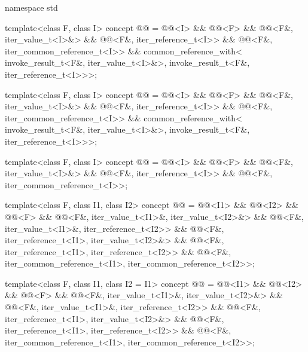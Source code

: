 \begin{codeblock}
namespace std {
  template<class F, class I>
    concept @@ =
      @@<I> &&
      @@<F> &&
      @@<F&, iter_value_t<I>&> &&
      @@<F&, iter_reference_t<I>> &&
      @@<F&, iter_common_reference_t<I>> &&
      common_reference_with<
        invoke_result_t<F&, iter_value_t<I>&>,
        invoke_result_t<F&, iter_reference_t<I>>>;

  template<class F, class I>
    concept @@ =
      @@<I> &&
      @@<F> &&
      @@<F&, iter_value_t<I>&> &&
      @@<F&, iter_reference_t<I>> &&
      @@<F&, iter_common_reference_t<I>> &&
      common_reference_with<
        invoke_result_t<F&, iter_value_t<I>&>,
        invoke_result_t<F&, iter_reference_t<I>>>;

  template<class F, class I>
    concept @@ =
      @@<I> &&
      @@<F> &&
      @@<F&, iter_value_t<I>&> &&
      @@<F&, iter_reference_t<I>> &&
      @@<F&, iter_common_reference_t<I>>;

  template<class F, class I1, class I2>
    concept @@ =
      @@<I1> && @@<I2> &&
      @@<F> &&
      @@<F&, iter_value_t<I1>&, iter_value_t<I2>&> &&
      @@<F&, iter_value_t<I1>&, iter_reference_t<I2>> &&
      @@<F&, iter_reference_t<I1>, iter_value_t<I2>&> &&
      @@<F&, iter_reference_t<I1>, iter_reference_t<I2>> &&
      @@<F&, iter_common_reference_t<I1>, iter_common_reference_t<I2>>;

  template<class F, class I1, class I2 = I1>
    concept @@ =
      @@<I1> && @@<I2> &&
      @@<F> &&
      @@<F&, iter_value_t<I1>&, iter_value_t<I2>&> &&
      @@<F&, iter_value_t<I1>&, iter_reference_t<I2>> &&
      @@<F&, iter_reference_t<I1>, iter_value_t<I2>&> &&
      @@<F&, iter_reference_t<I1>, iter_reference_t<I2>> &&
      @@<F&, iter_common_reference_t<I1>, iter_common_reference_t<I2>>;

}
\end{codeblock}
